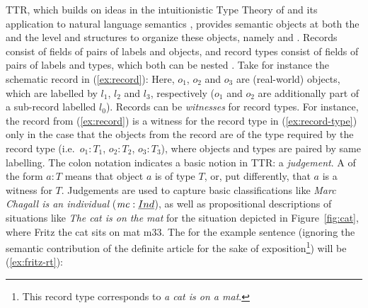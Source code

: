 \documentclass[output=paper
 	        ,biblatex
                ,babelshorthands
                ,newtxmath
                ,draftmode
                ,colorlinks, citecolor=brown
]{langscibook}
\begin{document}
TTR, which builds on ideas in the intuitionistic Type Theory of \citet{Martin-Loef:1984} and its application to natural language semantics \citep[see][]{Ranta:2015}, provides semantic objects at both the  and the  level and structures to organize these objects, namely  and  %
\citetext{see \citealp{Cooper:2005:a}, \citealp{Cooper:2005:b}, \citealp{Cooper:2012}, \citealp{Cooper:2017:a}, and \citealp{Cooper:Ginzburg:2015} for expositions}. 
%
Records consist of fields of pairs of labels and objects, and record types consist of fields of pairs of labels and types, which both can be nested \citep{Cooper:ms}.
%
%
Take for instance the schematic record in (\ref{ex:record}):
%
\ea \label{ex:record}
\avm{
[$l_0$ & = [$l_1$ & = $o_1$ \\
			$l_2$ & = $o_2$] \\
$l_3$ & = $o_3$]
}
\z
%
Here, $o_1$, $o_2$ and $o_3$ are (real-world) objects, which are labelled by $l_1$, $l_2$ and $l_3$, respectively ($o_1$ and $o_2$ are additionally part of a sub-record labelled $l_0$).
%
Records can be \emph{witnesses} for record types.
%
For instance, the record from (\ref{ex:record}) is a witness for the record type in (\ref{ex:record-type}) only in the case that the objects from the record are of the type required by the record type (i.e.\ $o_1 : T_1$, $o_2 : T_2$, $o_3 : T_3$), where objects and types are paired by same labelling.
%
\ea \label{ex:record-type}
\avm{
[$l_0$ & :	[$l_1$ & : $T_1$ \\
			$l_2$ & : $T_2$] \\
$l_3$ & : $T_3$ ]
}
\z
%
The colon notation indicates a basic notion in TTR: a \emph{judgement}. 
%
A  of the form $a : T$ means that object $a$ is of type $T$, or, put differently, that $a$ is a witness for $T$.
%
Judgements are used to capture basic classifications like \textit{Marc Chagall is an individual} ($\mathit{mc} : \emph{Ind}$), as well as propositional descriptions of situations like \textit{The cat is on the mat} for the situation depicted in Figure~\ref{fig:cat}, where Fritz the cat sits on mat m33. 
%
The  for the example sentence (ignoring the semantic contribution of the definite article for the sake of exposition\footnote{This record type corresponds to \textit{a cat is on a mat}.}) will be (\ref{ex:fritz-rt}):
\end{document}
